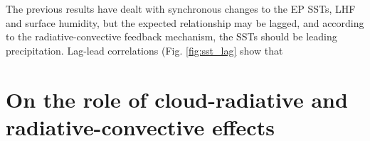 The previous results have dealt with synchronous changes to the EP SSTs, LHF and surface humidity, but the expected relationship may be lagged, and according to the radiative-convective feedback mechanism, the SSTs should be leading precipitation. 
Lag-lead correlations (Fig. \ref{fig:sst_lag} show that 






% 

\section{On the role of cloud-radiative and radiative-convective effects}






